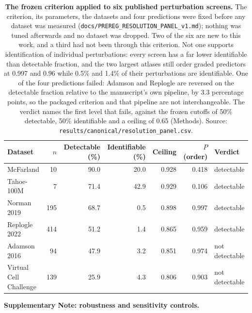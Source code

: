 \documentclass[11pt,letterpaper]{article}
\begin{document}
\begin{table}[H]
\centering
\caption{\textbf{The frozen criterion applied to six published perturbation screens.} The criterion, its parameters, the datasets and four predictions were fixed before any dataset was measured (\texttt{docs/PREREG\_RESOLUTION\_PANEL\_v1.md}); nothing was tuned afterwards and no dataset was dropped. Two of the six are new to this work, and a third had not been through this criterion. Not one supports identification of individual perturbations: every screen has a far lower identifiable than detectable fraction, and the two largest atlases still order graded predictors at 0.997 and 0.96 while 0.5\% and 1.4\% of their perturbations are identifiable. One of the four predictions failed: Adamson and Replogle are reversed on the detectable fraction relative to the manuscript's own pipeline, by 3.3 percentage points, so the packaged criterion and that pipeline are not interchangeable. The verdict names the first level that fails, against the frozen cutoffs of 50\% detectable, 50\% identifiable and a ceiling of 0.65 (Methods). Source: \texttt{results/canonical/resolution\_panel.csv}.}
\label{tab:panel}
\small
\begin{tabular}{@{}l r r r r r l@{}}
\toprule
Dataset & $n$ & Detectable (\%) & Identifiable (\%) & Ceiling & $P$(order) & Verdict \\
\midrule
McFarland & 10 & 90.0 & 20.0 & 0.928 & 0.418 & detectable \\
Tahoe-100M & 7 & 71.4 & 42.9 & 0.929 & 0.106 & detectable \\
Norman 2019 & 195 & 68.7 & 0.5 & 0.898 & 0.997 & detectable \\
Replogle 2022 & 414 & 51.2 & 1.4 & 0.865 & 0.959 & detectable \\
Adamson 2016 & 94 & 47.9 & 3.2 & 0.851 & 0.974 & not detectable \\
Virtual Cell Challenge & 139 & 25.9 & 4.3 & 0.806 & 0.903 & not detectable \\
\bottomrule
\end{tabular}
\end{table}

\bigskip

\small
\noindent\textbf{Supplementary Note: robustness and sensitivity controls.}
\end{document}
